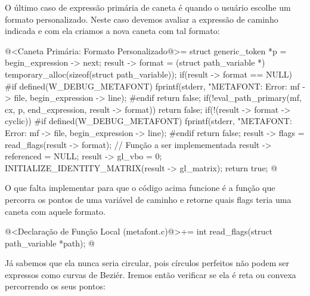 {O último caso de expressão primária de caneta é quando o usuário
escolhe um formato personalizado. Neste caso devemos avaliar a
expressão de caminho indicada e com ela criamos a nova caneta com tal
formato:

\iniciocodigo
@<Caneta Primária: Formato Personalizado@>=
struct generic_token *p = begin_expression -> next;
result -> format =
        (struct path_variable *) temporary_alloc(sizeof(struct path_variable));
if(result -> format == NULL){
#if defined(W_DEBUG_METAFONT)
  fprintf(stderr, "METAFONT: Error: %
          mf -> file, begin_expression -> line);
#endif
  return false;
}
if(!eval_path_primary(mf, cx, p, end_expression, result -> format))
  return false;
if(!(result -> format -> cyclic)){
#if defined(W_DEBUG_METAFONT)
  fprintf(stderr,
          "METAFONT: Error: %
          mf -> file, begin_expression -> line);
#endif
  return false;
}
result -> flags = read_flags(result -> format); // Função a ser implemementada
result -> referenced = NULL;
result -> gl_vbo = 0;
INITIALIZE_IDENTITY_MATRIX(result -> gl_matrix);
return true;
@
\fimcodigo

O que falta implementar para que o código acima funcione é a função
que percorra os pontos de uma variável de caminho e retorne quais
flags teria uma caneta com aquele formato.

\iniciocodigo
@<Declaração de Função Local (metafont.c)@>+=
int read_flags(struct path_variable *path);
@
\fimcodigo

Já sabemos que ela nunca seria circular, pois círculos perfeitos não
podem ser expressos como curvas de Beziér. Iremos então verificar se
ela é reta ou convexa percorrendo os seus pontos:

}
